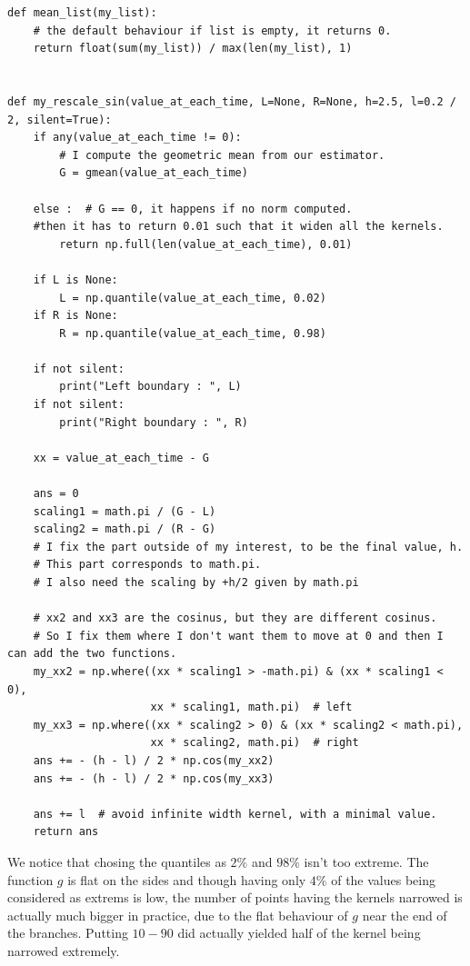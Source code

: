 \documentclass[11pt]{book}
\begin{document}
\begin{Verbatim}[fontsize=\footnotesize]
def mean_list(my_list):
    # the default behaviour if list is empty, it returns 0.
    return float(sum(my_list)) / max(len(my_list), 1)
    
    
def my_rescale_sin(value_at_each_time, L=None, R=None, h=2.5, l=0.2 / 2, silent=True):
    if any(value_at_each_time != 0):
        # I compute the geometric mean from our estimator.
        G = gmean(value_at_each_time)

    else :  # G == 0, it happens if no norm computed.
    #then it has to return 0.01 such that it widen all the kernels.
        return np.full(len(value_at_each_time), 0.01)

    if L is None:
        L = np.quantile(value_at_each_time, 0.02)
    if R is None:
        R = np.quantile(value_at_each_time, 0.98)

    if not silent:
        print("Left boundary : ", L)
    if not silent:
        print("Right boundary : ", R)

    xx = value_at_each_time - G

    ans = 0
    scaling1 = math.pi / (G - L)
    scaling2 = math.pi / (R - G)
    # I fix the part outside of my interest, to be the final value, h.
    # This part corresponds to math.pi.
    # I also need the scaling by +h/2 given by math.pi

    # xx2 and xx3 are the cosinus, but they are different cosinus.
    # So I fix them where I don't want them to move at 0 and then I can add the two functions.
    my_xx2 = np.where((xx * scaling1 > -math.pi) & (xx * scaling1 < 0),
                      xx * scaling1, math.pi)  # left
    my_xx3 = np.where((xx * scaling2 > 0) & (xx * scaling2 < math.pi),
                      xx * scaling2, math.pi)  # right
    ans += - (h - l) / 2 * np.cos(my_xx2)
    ans += - (h - l) / 2 * np.cos(my_xx3)

    ans += l  # avoid infinite width kernel, with a minimal value.
    return ans
\end{Verbatim}


\begin{remarque}
We notice that chosing the quantiles as $2\%$ and $98\%$ isn't too extreme. The function $g$ is flat on the sides and though having only $4\%$ of the values being considered as extrems is low, the number of points having the kernels narrowed is actually much bigger in practice, due to the flat behaviour of $g$ near the end of the branches. Putting $10-90$ did actually yielded half of the kernel being narrowed extremely.
\end{remarque}
\end{document}
